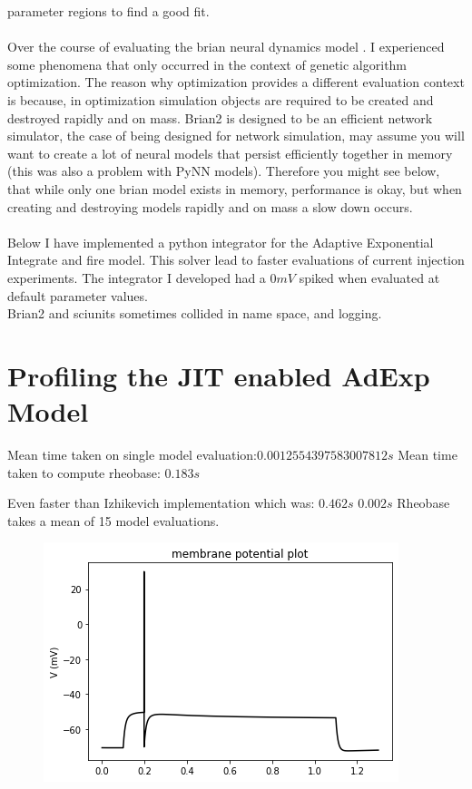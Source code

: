 parameter regions to find a good fit.\\
\\
Over the course of evaluating the brian neural dynamics model \cite{gerstner2014neuronal}. I experienced some phenomena that only occurred in the context of genetic algorithm optimization. The reason why optimization provides a different evaluation context is because, in optimization simulation objects are required to be created and destroyed rapidly and on mass. Brian2 is designed to be an efficient network simulator, the case of being designed for network simulation, may assume you will want to create a lot of neural models that persist efficiently together in memory (this was also a problem with PyNN models). Therefore you might see below, that while only one brian model exists in memory, performance is okay, but when creating and destroying models rapidly and on mass a slow down occurs.\\
\\
Below I have implemented a python integrator for the Adaptive
Exponential Integrate and fire model. This solver lead to faster
evaluations of current injection experiments. The integrator I developed
had a $0mV$ spiked when evaluated at default
parameter values.\\


Brian2 and sciunits sometimes collided in name space, and logging.

\section{Profiling the JIT enabled AdExp Model}
Mean time taken on single model evaluation:$ 0.0012554397583007812s $
Mean time taken to compute rheobase:
$0.183s $


Even faster than Izhikevich implementation which was: $ 0.462s $ $  0.002 s$
Rheobase takes a mean of 15 model evaluations.
\begin{figure}    
\begin{center}
\includegraphics[width=0.25\linewidth]{figures/backend_check_files/backend_check_6_2.png}
\caption{}

\end{center}
\end{figure}

